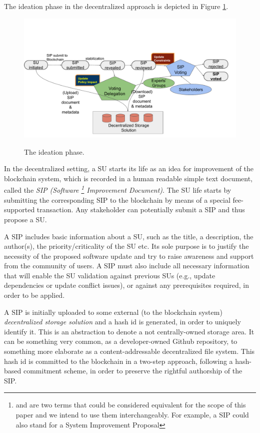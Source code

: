 The ideation phase in the decentralized approach is depicted in Figure \ref{ideation}.
\begin{figure}[h!] %
    \caption{The ideation phase.}
    \centering
    \includegraphics[width=1.0 \columnwidth,keepaspectratio]{figures/ideation_phase.pdf}
    \label{ideation}
\end{figure}
In the decentralized setting, a SU starts its life as an idea for improvement of the blockchain system, which is recorded in a human readable simple text document, called the \emph{SIP (Software  \footnote{ and  are two terms that could be considered equivalent for the scope of this paper and we intend to use them interchangeably. For example, a SIP could also stand for a System Improvement Proposal} Improvement Document)}. The SU life starts by submitting the corresponding SIP to the blockchain by means of a special fee-supported transaction. Any stakeholder can potentially submit a SIP and thus propose a SU. 

A SIP includes basic information about a SU, such as the title, a description, the author(s), the priority/criticality of the SU etc. Its sole purpose is to justify the necessity of the proposed software update and try to raise awareness and support from the community of users. A SIP must also include all necessary information that will enable the SU validation against previous SUs (e.g., update dependencies or update conflict issues), or against any prerequisites required, in order to be applied.

A SIP is initially uploaded to some external (to the blockchain system) \emph{decentralized storage solution} and a hash id is generated, in order to uniquely identify it. This is an abstraction to denote a not centrally-owned storage area.%
 It can be something very common, as a developer-owned Github repository, to something more elaborate as a content-addressable decentralized file system. This hash id is committed to the blockchain in a two-step approach, following a hash-based commitment scheme, in order to preserve the rightful authorship of the SIP.

